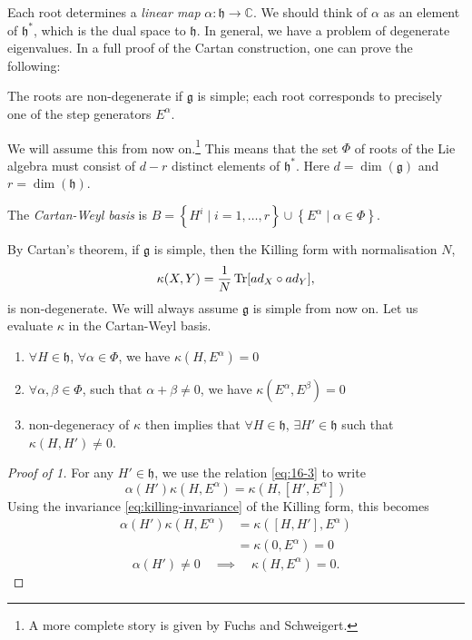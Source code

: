 Each root determines a \emph{linear map} $\alpha \colon \mathfrak{h} \to \mathbb{C}$. We should think of $\alpha$ as an element of $\mathfrak{h}^*$, which is the dual space to $\mathfrak{h}$.
In general, we have a problem of degenerate eigenvalues.
In a full proof of the Cartan construction, one can prove the following:
\begin{claim}
  The roots are non-degenerate if $\mathfrak{g}$ is simple; each root corresponds to precisely one of the step generators $E^{\alpha}$.
\end{claim}
We will assume this from now on.\footnote{A more complete story is given by Fuchs and Schweigert.}
This means that the set $\Phi$ of roots of the Lie algebra must consist of $d-r$ distinct elements of $\mathfrak{h}^*$. Here $d = \dim(\mathfrak{g})$ and $r = \dim(\mathfrak{h})$.
\begin{definition}[]
  The \emph{Cartan-Weyl basis} is $B = \left\{ H^{i} \mid i=1, \dots, r \right\} \cup \left\{ E^{\alpha} \mid \alpha \in \Phi \right\}$.
\end{definition}
By Cartan's theorem, if $\mathfrak{g}$ is simple, then the Killing form with normalisation $N$,
\begin{equation}
  \label{eq:16-4}
  \kappa(X, Y) = \frac{1}{N} \Tr[ad_X \circ ad_Y],
\end{equation}
is non-degenerate.
We will always assume $\mathfrak{g}$ is simple from now on.
Let us evaluate $\kappa$ in the Cartan-Weyl basis.
\begin{claim}
  \begin{enumerate}
    \item $\forall H \in \mathfrak{h}$, $\forall \alpha \in \Phi$, we have $\kappa(H, E^{\alpha}) = 0$
    \item $\forall \alpha, \beta \in \Phi$, such that $\alpha + \beta \neq 0$, we have $\kappa(E^{\alpha}, E^{\beta}) =0$
    \item non-degeneracy of $\kappa$ then implies that $\forall H \in \mathfrak{h}$, $\exists H' \in \mathfrak{h}$ such that $\kappa(H, H') \neq 0$.
  \end{enumerate}
\end{claim}
\begin{proof}[Proof of 1]
  \item For any $H' \in \mathfrak{h}$, we use the relation \eqref{eq:16-3} to write
    \begin{equation}
      \alpha(H') \kappa(H, E^{\alpha}) = \kappa(H, [H', E^{\alpha} ])
    \end{equation}
    Using the invariance \eqref{eq:killing-invariance} of the Killing form, this becomes
    \begin{align}
      \alpha(H') \kappa(H, E^{\alpha}) &= \kappa ([H, H'], E^{\alpha})\\
       &= \kappa (0, E^{\alpha}) = 0
    \end{align}
    \begin{equation}
      \alpha(H') \neq 0 \quad \implies \quad \kappa(H, E^{\alpha}) = 0.
    \end{equation}
\end{proof}
